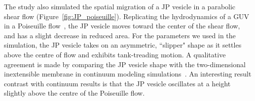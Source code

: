 The study also simulated the spatial migration of a JP vesicle in a
parabolic shear flow (Figure~\ref{fig:JP_poiseuille}). Replicating the
hydrodynamics of a GUV in a Poiseuille flow~\cite{Kaoui09,
dan_vla_mis2009, cou_kao_pod_mis2008}, the JP vesicle moves toward the
center of the shear flow, and has a slight decrease in reduced area.
For the parameters we used in the simulation, the JP vesicle takes on an
asymmetric, ``slipper" shape as it settles above the centre of flow and
exhibits tank-treading motion. A qualitative agreement is made by
comparing the JP vesicle shape with the two-dimensional inextensible
membrane in continuum modeling simulations~\cite{Kaoui09,
dan_vla_mis2009, cou_kao_pod_mis2008}. An interesting result contrast
with continuum results is that the JP vesicle oscillates at a height
slightly above the centre of the Poiseuille flow. 



